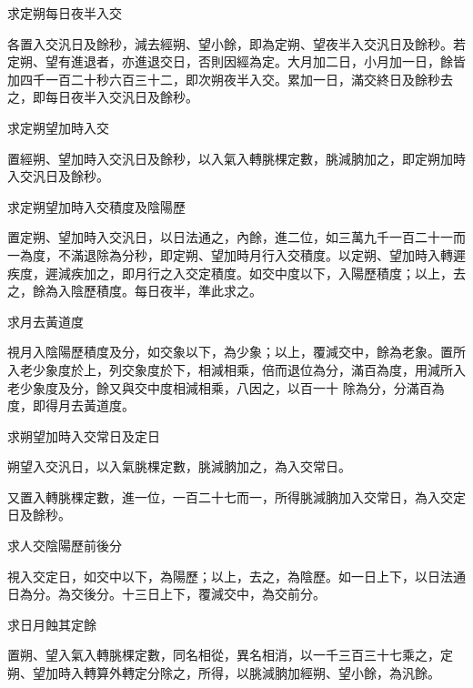 \begin{pinyinscope}
 求定朔每日夜半入交



 各置入交汎日及餘秒，減去經朔、望小餘，即為定朔、望夜半入交汎日及餘秒。若定朔、望有進退者，亦進退交日，否則因經為定。大月加二日，小月加一日，餘皆加四千一百二十秒六百三十二，即次朔夜半入交。累加一日，滿交終日及餘秒去之，即每日夜半入交汎日及餘秒。



 求定朔望加時入交



 置經朔、望加時入交汎日及餘秒，以入氣入轉朓棵定數，朓減朒加之，即定朔加時入交汎日及餘秒。



 求定朔望加時入交積度及陰陽歷



 置定朔、望加時入交汎日，以日法通之，內餘，進二位，如三萬九千一百二十一而一為度，不滿退除為分秒，即定朔、望加時月行入交積度。以定朔、望加時入轉遲疾度，遲減疾加之，即月行之入交定積度。如交中度以下，入陽歷積度；以上，去之，餘為入陰歷積度。每日夜半，準此求之。



 求月去黃道度



 視月入陰陽歷積度及分，如交象以下，為少象；以上，覆減交中，餘為老象。置所入老少象度於上，列交象度於下，相減相乘，倍而退位為分，滿百為度，用減所入老少象度及分，餘又與交中度相減相乘，八因之，以百一十
 除為分，分滿百為度，即得月去黃道度。



 求朔望加時入交常日及定日



 朔望入交汎日，以入氣朓棵定數，朓減朒加之，為入交常日。



 又置入轉朓棵定數，進一位，一百二十七而一，所得朓減朒加入交常日，為入交定日及餘秒。



 求人交陰陽歷前後分



 視入交定日，如交中以下，為陽歷；以上，去之，為陰歷。如一日上下，以日法通日為分。為交後分。十三日上下，覆減交中，為交前分。



 求日月蝕其定餘



 置朔、望入氣入轉朓棵定數，同名相從，異名相消，以一千三百三十七乘之，定朔、望加時入轉算外轉定分除之，所得，以朓減朒加經朔、望小餘，為汎餘。




\end{pinyinscope}

